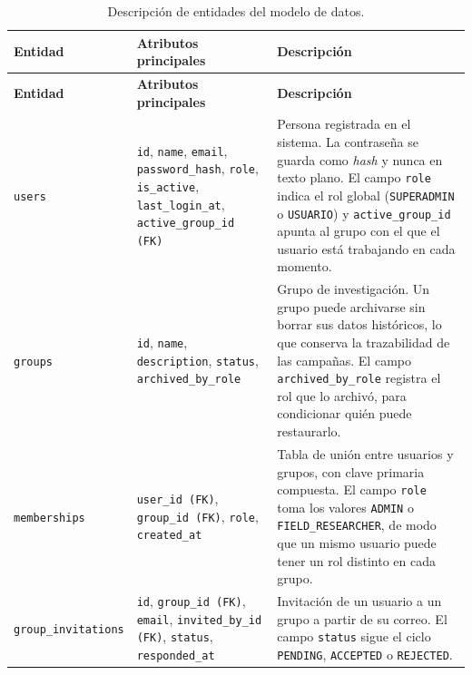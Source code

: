 \begingroup
\small
\begin{longtable}{@{}>{\raggedright\arraybackslash}p{3.8cm}
                  >{\raggedright\arraybackslash}p{5.3cm}
                  >{\raggedright\arraybackslash}p{6.0cm}@{}}
  \caption{Descripción de entidades del modelo de datos.}
  \label{tab:entidades} \\
  \toprule
  \textbf{Entidad} & \textbf{Atributos principales} & \textbf{Descripción} \\
  \midrule
  \endfirsthead
  \toprule
  \textbf{Entidad} & \textbf{Atributos principales} & \textbf{Descripción} \\
  \midrule
  \endhead
  \bottomrule
  \endfoot

  \texttt{users} &
    \texttt{id}, \texttt{name}, \texttt{email}, \texttt{password\_hash},
    \texttt{role}, \texttt{is\_active}, \texttt{last\_login\_at},
    \texttt{active\_group\_id (FK)} &
    Persona registrada en el sistema. La contraseña se guarda como \textit{hash} y
    nunca en texto plano. El campo \texttt{role} indica el rol global
    (\texttt{SUPERADMIN} o \texttt{USUARIO}) y \texttt{active\_group\_id} apunta al
    grupo con el que el usuario está trabajando en cada momento. \\[4pt]

  \texttt{groups} &
    \texttt{id}, \texttt{name}, \texttt{description}, \texttt{status},
    \texttt{archived\_by\_role} &
    Grupo de investigación. Un grupo puede archivarse sin borrar sus datos
    históricos, lo que conserva la trazabilidad de las campañas. El campo
    \texttt{archived\_by\_role} registra el rol que lo archivó, para condicionar quién
    puede restaurarlo. \\[4pt]

  \texttt{memberships} &
    \texttt{user\_id (FK)}, \texttt{group\_id (FK)}, \texttt{role},
    \texttt{created\_at} &
    Tabla de unión entre usuarios y grupos, con clave primaria compuesta. El campo
    \texttt{role} toma los valores \texttt{ADMIN} o \texttt{FIELD\_RESEARCHER}, de
    modo que un mismo usuario puede tener un rol distinto en cada grupo. \\[4pt]

  \texttt{group\_}\allowbreak{}\texttt{invitations} &
    \texttt{id}, \texttt{group\_id (FK)}, \texttt{email},
    \texttt{invited\_by\_id (FK)}, \texttt{status}, \texttt{responded\_at} &
    Invitación de un usuario a un grupo a partir de su correo. El campo
    \texttt{status} sigue el ciclo \texttt{PENDING}, \texttt{ACCEPTED} o
    \texttt{REJECTED}. \\[4pt]


\end{longtable}
